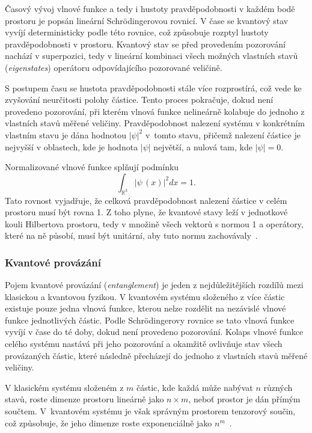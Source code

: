 Časový vývoj vlnové funkce a tedy i hustoty pravděpodobnosti v každém bodě prostoru je popsán lineární Schrödingerovou rovnicí. 
V čase se kvantový stav vyvíjí deterministicky podle této rovnice, což způsobuje rozptyl hustoty pravděpodobnosti v prostoru. 
Kvantový stav se před provedením pozorování nachází v superpozici, tedy v lineární kombinaci všech možných vlastních stavů (\emph{eigenstates}) operátoru odpovídajícího pozorované veličině. 
    
S postupem času se hustota pravděpodobnosti stále více rozprostírá, což vede ke zvyšování neurčitosti polohy částice. 
Tento proces pokračuje, dokud není provedeno pozorování, při kterém vlnová funkce nelineárně kolabuje do jednoho z vlastních stavů měřené veličiny. 
Pravděpodobnost nalezení systému v konkrétním vlastním stavu je dána hodnotou $\left| \psi \right|^2$ v~tomto stavu, přičemž nalezení částice je nejvyšší v oblastech, kde je hodnota $\left| \psi \right|$ největší, a nulová tam, kde $\left| \psi \right| = 0$.
    
Normalizované vlnové funkce splňují podmínku
\[
    \int_{\mathbb{R}^3} \left|\psi\,(x)\right|^2 dx = 1.
\]
Tato rovnost vyjadřuje, že celková pravděpodobnost nalezení částice v celém prostoru musí být rovna 1.
Z toho plyne, že kvantové stavy leží v jednotkové kouli Hilbertova prostoru, tedy v množině všech vektorů s normou 1 a operátory, které na ně působí, musí být unitární, aby tuto normu zachovávaly~\cite{NaturalComputing}.

\subsubsection*{Kvantové provázání}
Pojem kvantové provázání (\emph{entanglement}) je jeden z nejdůležitějších rozdílů mezi klasickou a kvantovou fyzikou. 
V kvantovém systému složeného z více částic existuje pouze jedna vlnová funkce, kterou nelze rozdělit na nezávislé vlnové funkce jednotlivých částic. 
Podle Schrödingerovy rovnice se tato vlnová funkce vyvíjí v čase do té doby, dokud není provedeno pozorování.
Kolaps vlnové funkce celého systému nastává při jeho pozorování a okamžitě ovlivňuje stav všech provázaných částic, které následně přecházejí do jednoho z vlastních stavů měřené veličiny.

V klasickém systému složeném z $m$ částic, kde každá může nabývat $n$ různých stavů, roste dimenze prostoru lineárně jako $n \times m$, neboť prostor je dán přímým součtem.
V~kvantovém systému je však správným prostorem tenzorový součin, což způsobuje, že jeho dimenze roste exponenciálně jako $n^m$~\cite{NaturalComputing,QuantumComputing-QuantumInformation}.

